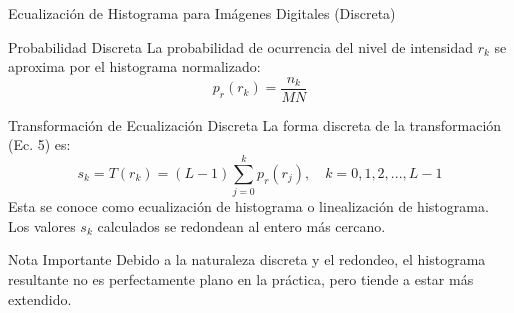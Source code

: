 \documentclass{beamer}
\begin{document}
\begin{frame}{Ecualización de Histograma para Imágenes Digitales (Discreta)}\footnotesize
  \begin{block}{\footnotesize{Probabilidad Discreta}}
    La probabilidad de ocurrencia del nivel de intensidad $r_k$ se aproxima por el histograma normalizado:
    \begin{equation}
      p_r(r_k) = \frac{n_k}{MN}
    \end{equation}
  \end{block}
  \pause
  \begin{alertblock}{\footnotesize{Transformación de Ecualización Discreta}}
    La forma discreta de la transformación (Ec. 5) es:
    \begin{equation}
      s_k = T(r_k) = (L-1) \sum_{j=0}^{k} p_r(r_j), \quad k=0,1,2,...,L-1
    \end{equation}
    Esta se conoce como ecualización de histograma o linealización de histograma. Los valores $s_k$ calculados se redondean al entero más cercano.
  \end{alertblock}
  \begin{exampleblock}{\footnotesize{Nota Importante}}
    Debido a la naturaleza discreta y el redondeo, el histograma resultante no es perfectamente plano en la práctica, pero tiende a estar más extendido.
  \end{exampleblock}
\end{frame}
\end{document}
